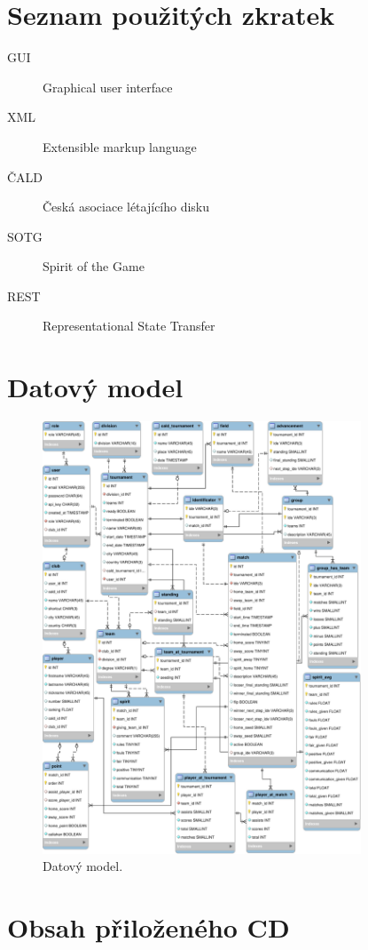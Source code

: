 \documentclass[thesis=B,czech]{FITthesis}[2012/06/26]
\begin{document}


\appendix
% 
\chapter{Seznam použitých zkratek}
\begin{description}
	\item[GUI] Graphical user interface
	\item[XML] Extensible markup language
	\item[ČALD] Česká asociace létajícího disku
	\item[SOTG] Spirit of the Game
	\item[REST] Representational State Transfer
\end{description}

\chapter{Datový model}
  \label{appendix:data_model}
  \begin{figure}[ht!]
    \centering
    \includegraphics[width=95mm]{./images/datovy-model.pdf}
    \caption{Datový model.\label{overflow}}
    \label{fig:domain_model}
  \end{figure}

\chapter{Obsah přiloženého CD}


\begin{figure}
\end{figure}
\end{document}
